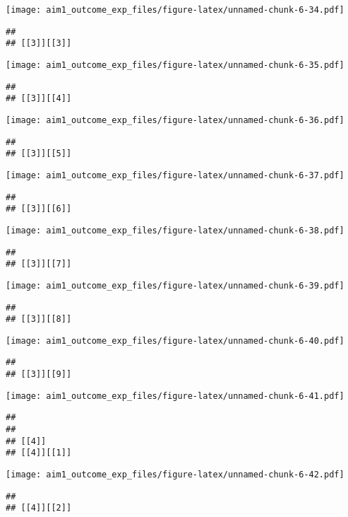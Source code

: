 \documentclass[
]{article}
\begin{document}
\texttt{[image: aim1\_outcome\_exp\_files/figure-latex/unnamed-chunk-6-34.pdf]}

\begin{verbatim}
## 
## [[3]][[3]]
\end{verbatim}

\texttt{[image: aim1\_outcome\_exp\_files/figure-latex/unnamed-chunk-6-35.pdf]}

\begin{verbatim}
## 
## [[3]][[4]]
\end{verbatim}

\texttt{[image: aim1\_outcome\_exp\_files/figure-latex/unnamed-chunk-6-36.pdf]}

\begin{verbatim}
## 
## [[3]][[5]]
\end{verbatim}

\texttt{[image: aim1\_outcome\_exp\_files/figure-latex/unnamed-chunk-6-37.pdf]}

\begin{verbatim}
## 
## [[3]][[6]]
\end{verbatim}

\texttt{[image: aim1\_outcome\_exp\_files/figure-latex/unnamed-chunk-6-38.pdf]}

\begin{verbatim}
## 
## [[3]][[7]]
\end{verbatim}

\texttt{[image: aim1\_outcome\_exp\_files/figure-latex/unnamed-chunk-6-39.pdf]}

\begin{verbatim}
## 
## [[3]][[8]]
\end{verbatim}

\texttt{[image: aim1\_outcome\_exp\_files/figure-latex/unnamed-chunk-6-40.pdf]}

\begin{verbatim}
## 
## [[3]][[9]]
\end{verbatim}

\texttt{[image: aim1\_outcome\_exp\_files/figure-latex/unnamed-chunk-6-41.pdf]}

\begin{verbatim}
## 
## 
## [[4]]
## [[4]][[1]]
\end{verbatim}

\texttt{[image: aim1\_outcome\_exp\_files/figure-latex/unnamed-chunk-6-42.pdf]}

\begin{verbatim}
## 
## [[4]][[2]]
\end{verbatim}
\end{document}
